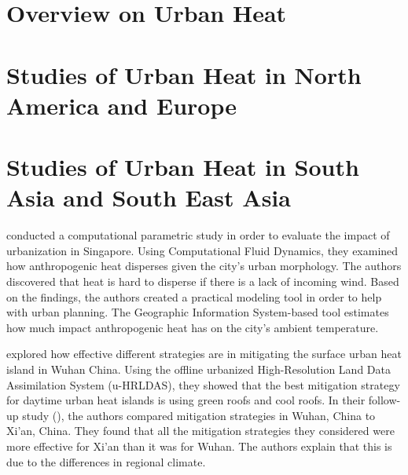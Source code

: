 \section{Overview on Urban Heat}
	\blindtext
	
\section{Studies of Urban Heat in North America and Europe}
	\blindtext
	
\section{Studies of Urban Heat in South Asia and South East Asia}
	\textcite{Yuan2020} conducted a computational parametric study in order to evaluate the impact of urbanization in Singapore.
	Using Computational Fluid Dynamics, they examined how anthropogenic heat disperses given the city's urban morphology.
	The authors discovered that heat is hard to disperse if there is a lack of incoming wind.
	Based on the findings, the authors created a practical modeling tool in order to help with urban planning. 
	The Geographic Information System-based tool estimates how much impact anthropogenic heat has on the city's ambient temperature.
	
	\textcite{Gao2019} explored how effective different strategies are in mitigating the surface urban heat island in Wuhan China.
	Using the offline urbanized High-Resolution Land Data Assimilation System (u-HRLDAS), they showed that the best mitigation strategy for daytime urban heat islands is using green roofs and cool roofs.
	In their follow-up study (\cite{Gao2020}), the authors compared mitigation strategies in Wuhan, China to Xi'an, China.
	They found that all the mitigation strategies they considered were more effective for Xi'an than it was for Wuhan. 
	The authors explain that this is due to the differences in regional climate.